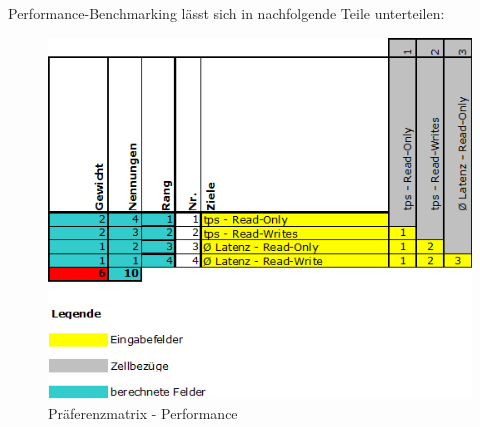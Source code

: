 \begin{flushleft}
    Performance-Benchmarking lässt sich in nachfolgende Teile unterteilen:
    \begin{figure}[H]
        \centering
        \includegraphics[width=1\linewidth]{source/implementation/evaluation/requirements/preference_matrix_performance}
        \caption{Präferenzmatrix - Performance}
        \label{fig:preference_matrix_performance}
    \end{figure}
\end{flushleft}